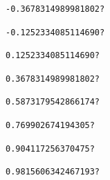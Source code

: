 \documentclass[11pt]{article}
\begin{document}
\begin{verbatim}
-0.3678314989981802?
    \end{verbatim}



\begin{verbatim}
-0.1252334085114690?
    \end{verbatim}



\begin{verbatim}
0.1252334085114690?
    \end{verbatim}



\begin{verbatim}
0.3678314989981802?
    \end{verbatim}



\begin{verbatim}
0.5873179542866174?
    \end{verbatim}



\begin{verbatim}
0.769902674194305?
    \end{verbatim}



\begin{verbatim}
0.904117256370475?
    \end{verbatim}



\begin{verbatim}
0.9815606342467193?
    \end{verbatim}


\begin{center}
\end{center}
{ \hspace*{\fill} \\}
\end{document}
